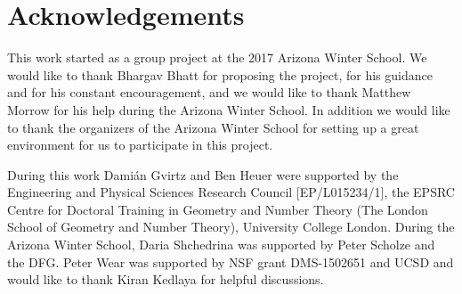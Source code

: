 \documentclass[10pt,oneside]{amsart}
\theoremstyle{definition}
\newtheorem{question}[theorem]{Question}
\newtheorem{example}[theorem]{Example}
\begin{document}
 \begin{comment}
Now we end the introduction by describing the content of each section. 

	\begin{question} \label{question_intro}
	    \begin{enumerate} 
	    \item		Given a rigid group $G$, when is there an adic space $G_\infty$ such that $G_\infty \sim  \varprojlim_{[p]} G ?$
	    \item If it exists, and $K$ is perfectoid, when is $G_\infty$ perfectoid?
	    \end{enumerate}
	\end{question}
 
 
	But before we give proofs for examples of rigid groups $G$ for which a perfectoid tilde-limit exists, we first note that the second question certainly doesn't have an affirmative answer for all rigid group varieties:
	\begin{example}
		For the additive group $\mathbb G_a^{\operatorname{an}}$, we know that $[p]$ is an isomorphism and therefore $\varprojlim_{[p]} \mathbb G_a=\mathbb G_a$ exists (even as an actual limit in the category of adic spaces) but is certainly not perfectoid.
	\end{example}

\end{comment} 
 
 
 
 \section*{Acknowledgements}
 This work started as a group project at the 2017 Arizona Winter School. We would like to thank Bhargav Bhatt for proposing the project, for his guidance and for his constant encouragement, and we would like to thank Matthew Morrow for his help during the Arizona Winter School. In addition we would like to thank the organizers of the Arizona Winter School for setting up a great environment for us to participate in this project. 
 
 During this work Dami\'an Gvirtz and Ben Heuer were supported by the Engineering and Physical Sciences Research Council [EP/L015234/1], the EPSRC Centre for Doctoral Training in Geometry and Number Theory (The London School of Geometry and Number Theory), University College London. 
 During the Arizona Winter School, Daria Shchedrina was supported by Peter Scholze and the DFG.
 Peter Wear was supported by NSF grant DMS-1502651 and UCSD and would like to thank Kiran Kedlaya for helpful discussions.
\end{document}
